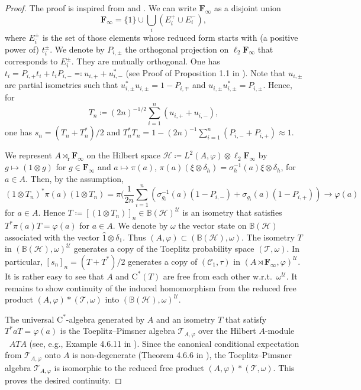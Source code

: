 \documentclass[12pt,nosumlimits,nonamelimits]{amsart}
\theoremstyle{remark}
\theoremstyle{definition}
\newcommand{\IB}{\mathbb{B}}
\newcommand{\bF}{\mathbf{F}}
\newcommand{\cC}{\mathcal{C}}
\newcommand{\cH}{\mathcal{H}}
\newcommand{\cT}{\mathcal{T}}
\newcommand{\cU}{\mathcal{U}}
\newcommand{\vp}{\varphi}
\newcommand{\cspan}{\mathop{\overline{\mathrm{span}}}}
\begin{document}
\begin{proof}
The proof is inspired from \cite{vdn} and \cite{hp}. 
We can write $\bF_\infty$ as a disjoint union 
\[
\bF_\infty=\{1\}\cup\bigcup_i (E_i^+\cup E_i^{-}),
\]
where $E_i^\pm$ is the set of those elements  
whose reduced form starts with (a positive power of) $t_i^\pm$. 
We denote by $P_{i,\pm}$ the orthogonal projection on $\ell_2\bF_\infty$ 
that corresponds to $E_i^\pm$. They are mutually orthogonal. 
One has
$t_i = P_{i,+}t_i + t_iP_{i,-} \eqcolon u_{i,+} + u_{i,-}^*$ (see Proof of Proposition 1.1 in \cite{hp}). 
Note that $u_{i,\pm}$ are partial isometries such that 
$u_{i,\pm}^*u_{i,\pm}=1-P_{i,\mp}$ and $u_{i,\pm}u_{i,\pm}^*=P_{i,\pm}$. 
Hence, for 
\[
T_n \coloneq (2n)^{-1/2}\sum_{i=1}^n (u_{i,+}+u_{i,-}),
\] 
one has $s_n = (T_n+T_n^*)/2$ and 
$T_n^*T_n = 1 - (2n)^{-1}\sum_{i=1}^n (P_{i,-}+P_{i,+}) \approx 1$.

We represent 
$A\rtimes_\mathrm{r}\bF_\infty$ on 
the Hilbert space 
$\cH \coloneq L^2(A,\vp)\otimes\ell_2\bF_\infty$ by 
$g\mapsto (1\otimes g)$ for $g\in \bF_\infty$ and 
$a\mapsto \pi(a)$, 
$\pi(a)(\xi\otimes\delta_h) = \sigma_h^{-1}(a)\xi \otimes\delta_h$, 
for $a\in A$. 
Then, by the assumption, 
\[
(1\otimes T_n)^*\pi(a)(1\otimes T_n) 
= \pi(\frac{1}{2n}\sum_{i=1}^n (\sigma_{g_i}^{-1}(a)(1-P_{i,-})+\sigma_{g_i}(a)(1-P_{i,+}))
\to \vp(a)
\]
for $a\in A$. 
Hence $T \coloneq [(1\otimes T_n)]_n \in \IB(\cH)^\cU$ 
is an isometry that satisfies 
$T^*\pi(a) T=\vp(a)$ for $a\in A$. 
We denote by $\omega$ the vector state 
on $\IB(\cH)$ associated 
with the vector $\hat{1}\otimes\delta_1$. 
Thus 
$(A,\vp)\subset(\IB(\cH),\omega)$. 
The isometry $T$ in $(\IB(\cH),\omega)^\cU$ 
generates a copy of the Toeplitz probability space $(\cT,\omega)$. 
In particular, $[s_n]_n = (T+T^*)/2$ generates a copy of 
$(\cC_1,\tau)$ in $(A\rtimes\bF_\infty,\vp)^\cU$.  
It is rather easy to see that $A$ and $\mathrm{C}^*(T)$ are 
free from each other w.r.t.\ $\omega^\cU$. 
It remains to show continuity of the induced homomorphism 
from the reduced free product $(A,\vp)\ast(\cT,\omega)$ 
into $(\IB(\cH),\omega)^\cU$. 

The universal $\mathrm{C}^*$-alge\-bra generated by $A$ and an isometry $T$ 
that satisfy $T^*aT=\vp(a)$ is the Toeplitz--Pimsner algebra $\cT_{A,\vp}$ 
over the Hilbert $A$-module $\cspan ATA$ 
(see, e.g., Example 4.6.11 in \cite{bo}). 
Since the canonical conditional expectation from $\cT_{A,\vp}$ 
onto $A$ is non-degenerate (Theorem 4.6.6 in \cite{bo}), 
the Toeplitz--Pimsner algebra 
$\cT_{A,\vp}$ is isomorphic to the reduced free product 
$(A,\vp)*(\cT,\omega)$. 
This proves the desired continuity.
\end{proof}
\end{document}

